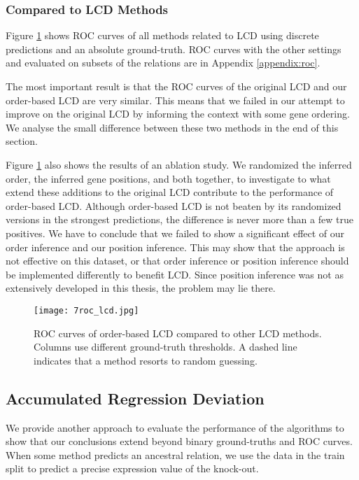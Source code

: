 \subsubsection{Compared to LCD Methods}

Figure \ref{fig:7:roclcd} shows ROC curves of all methods related to LCD using discrete predictions and an absolute ground-truth. ROC curves with the other settings and evaluated on subsets of the relations are in Appendix \ref{appendix:roc}.

The most important result is that the ROC curves of the original LCD and our order-based LCD are very similar. This means that we failed in our attempt to improve on the original LCD by informing the context with some gene ordering. We analyse the small difference between these two methods in the end of this section.

Figure \ref{fig:7:roclcd} also shows the results of an ablation study. We randomized the inferred order, the inferred gene positions, and both together, to investigate to what extend these additions to the original LCD contribute to the performance of order-based LCD. Although order-based LCD is not beaten by its randomized versions in the strongest predictions, the difference is never more than a few true positives. We have to conclude that we failed to show a significant effect of our order inference and our position inference. This may show that the approach is not effective on this dataset, or that order inference or position inference should be implemented differently to benefit LCD. Since position inference was not as extensively developed in this thesis, the problem may lie there.

\begin{figure}[h]
    \centering
    \texttt{[image: 7roc\_lcd.jpg]}
    \caption{ROC curves of order-based LCD compared to other LCD methods. Columns use different ground-truth thresholds. A dashed line indicates that a method resorts to random guessing.}
    \label{fig:7:roclcd}
\end{figure}

\subsection{Accumulated Regression Deviation}

We provide another approach to evaluate the performance of the algorithms to show that our conclusions extend beyond binary ground-truths and ROC curves. When some method predicts an ancestral relation, we use the data in the train split to predict a precise expression value of the knock-out. 


